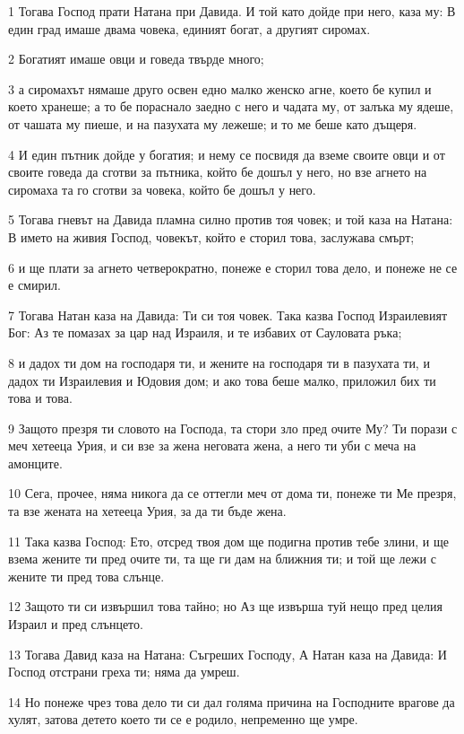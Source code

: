 \par 1 Тогава Господ прати Натана при Давида. И той като дойде при него, каза му: В един град имаше двама човека, единият богат, а другият сиромах.
\par 2 Богатият имаше овци и говеда твърде много;
\par 3 а сиромахът нямаше друго освен едно малко женско агне, което бе купил и което хранеше; а то бе пораснало заедно с него и чадата му, от залъка му ядеше, от чашата му пиеше, и на пазухата му лежеше; и то ме беше като дъщеря.
\par 4 И един пътник дойде у богатия; и нему се посвидя да вземе своите овци и от своите говеда да сготви за пътника, който бе дошъл у него, но взе агнето на сиромаха та го сготви за човека, който бе дошъл у него.
\par 5 Тогава гневът на Давида пламна силно против тоя човек; и той каза на Натана: В името на живия Господ, човекът, който е сторил това, заслужава смърт;
\par 6 и ще плати за агнето четверократно, понеже е сторил това дело, и понеже не се е смирил.
\par 7 Тогава Натан каза на Давида: Ти си тоя човек. Така казва Господ Израилевият Бог: Аз те помазах за цар над Израиля, и те избавих от Сауловата ръка;
\par 8 и дадох ти дом на господаря ти, и жените на господаря ти в пазухата ти, и дадох ти Израилевия и Юдовия дом; и ако това беше малко, приложил бих ти това и това.
\par 9 Защото презря ти словото на Господа, та стори зло пред очите Му? Ти порази с меч хетееца Урия, и си взе за жена неговата жена, а него ти уби с меча на амонците.
\par 10 Сега, прочее, няма никога да се оттегли меч от дома ти, понеже ти Ме презря, та взе жената на хетееца Урия, за да ти бъде жена.
\par 11 Така казва Господ: Ето, отсред твоя дом ще подигна против тебе злини, и ще взема жените ти пред очите ти, та ще ги дам на ближния ти; и той ще лежи с жените ти пред това слънце.
\par 12 Защото ти си извършил това тайно; но Аз ще извърша туй нещо пред целия Израил и пред слънцето.
\par 13 Тогава Давид каза на Натана: Съгреших Господу, А Натан каза на Давида: И Господ отстрани греха ти; няма да умреш.
\par 14 Но понеже чрез това дело ти си дал голяма причина на Господните врагове да хулят, затова детето което ти се е родило, непременно ще умре.
